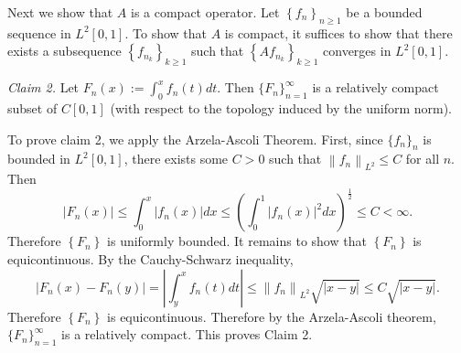 \documentclass[answers]{exam}
\theoremstyle{problemstyle}
\newcommand{\vt}{\vskip 5mm} %
\newcommand{\norm}[1]{\left\lVert#1\right\rVert} %
\newcommand{\1}[1]{\textbf{1}_{\left[#1\right]}} %
\def\({\left (}
\def\){\right )}
\begin{document}
\begin{questions}
\begin{solution}
  Next we show that $A$ is a compact operator. Let $\left\{ f_{n} \right\}_{n\geq 1}$ be a bounded sequence in $L^{2}[0,1]$. To show that $A$ is compact, it suffices to show that there exists a subsequence $\left\{ f_{n_{k}} \right\}_{k\geq 1}$ such that $\left\{ Af_{n_{k}} \right\}_{k\geq 1}$ converges in $L^{2}[0,1]$.

  
  \vt
  \textit{Claim 2.} Let $F_{n}(x):=\int_{0}^{x}f_{n}(t)dt$. Then $\{F_{n}\}_{n=1}^{\infty}$ is a relatively compact subset of $C[0,1]$ (with respect to the topology induced by the uniform norm).

  To prove claim 2, we apply the Arzela-Ascoli Theorem. First, since $\{f_{n}\}_{n}$ is bounded in $L^{2}[0,1]$, there exists some $C>0$ such that $\norm{f_{n}}_{L^{2}}\leq C$ for all $n$. Then
  \begin{equation*}
    |F_{n}(x)| \leq \int_{0}^{x}|f_{n}(x)|dx \leq \(\int_{0}^{1}|f_{n}(x)|^{2}dx \)^{\frac{1}{2}} \leq C <\infty.
  \end{equation*}
  Therefore $\left\{ F_{n} \right\}$ is uniformly bounded. It remains to show that $\left\{ F_{n} \right\}$ is equicontinuous. By the Cauchy-Schwarz inequality,
  \begin{equation*}
    \left| F_{n}(x)-F_{n}(y) \right| = \left| \int_{y}^{x}f_{n}(t)dt \right| \leq \norm{f_{n}}_{L^{2}} \sqrt{|x-y|} \leq C \sqrt{|x-y|}.
  \end{equation*}
  Therefore  $\left\{ F_{n} \right\}$ is equicontinuous. Therefore by the Arzela-Ascoli theorem, $\{F_{n}\}_{n=1}^{\infty}$ is a relatively compact. This proves Claim 2.


\end{solution}
\end{questions}
\end{document}

